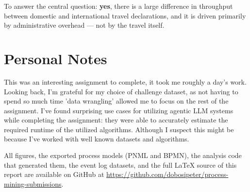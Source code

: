 \documentclass[11pt,a4paper]{article}
\begin{document}
To answer the central question: \textbf{yes}, there is a large difference in throughput between domestic and international travel declarations, and it is driven primarily by administrative overhead — not by the travel itself.

\section{Personal Notes}

This was an interesting assignment to complete, it took me roughly a day's work. Looking back, I'm grateful for my choice of challenge dataset, as not having to spend so much time 'data wrangling' allowed me to focus on the rest of the assignment. I've found surprising use cases for utilizing agentic LLM systems while completing the assignment: they were able to accurately estimate the required runtime of the utilized algorithms. Although I suspect this might be because I've worked with well known datasets and algorithms. 

All figures, the exported process models (PNML and BPMN), the analysis code that generated them, the event log datasets, and the full \LaTeX{} source of this report are available on GitHub at \url{https://github.com/dobosipeter/process-mining-submissions}.
\end{document}
